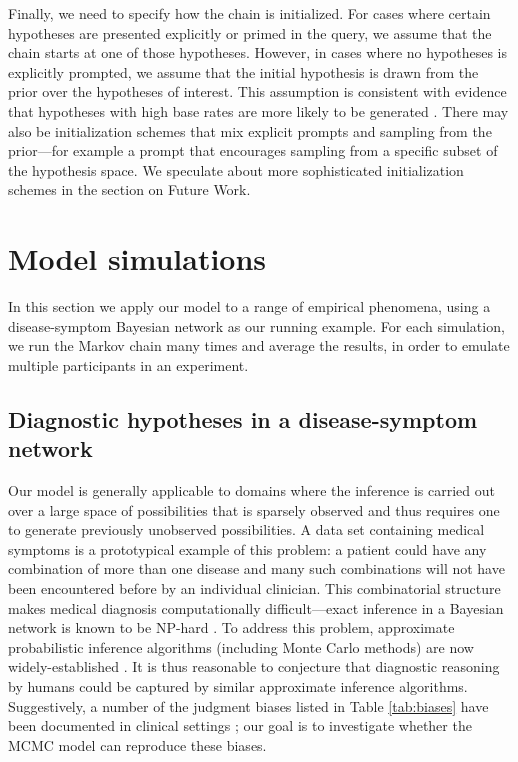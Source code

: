 
Finally, we need to specify how the chain is initialized. For cases where certain hypotheses are presented explicitly or primed in the query, we assume that the chain starts at one of those hypotheses. However, in cases where no hypotheses is explicitly prompted, we assume that the initial hypothesis is drawn from the prior over the hypotheses of interest. This assumption is consistent with evidence that hypotheses with high base rates are more likely to be generated \citep{weber1993}. There may also be initialization schemes that mix explicit prompts and sampling from the prior---for example a prompt that encourages sampling from a specific subset of the hypothesis space. We speculate about more sophisticated initialization schemes in the section on Future Work.
\section{Model simulations}

In this section we apply our model to a range of empirical phenomena, using a disease-symptom Bayesian network as our running example. For each simulation, we run the Markov chain many times and average the results, in order to emulate multiple participants in an experiment.

\subsection{Diagnostic hypotheses in a disease-symptom network}

Our model is generally applicable to domains where the inference is carried out over a large space of possibilities that is sparsely observed and thus requires one to generate previously unobserved possibilities. A data set containing medical symptoms is a prototypical example of this problem: a patient could have any combination of more than one disease and many such combinations will not have been encountered before by an individual clinician. This combinatorial structure makes medical diagnosis computationally difficult---exact inference in a Bayesian network is known to be NP-hard \citep{cooper1990complexity}. To address this problem, approximate probabilistic inference algorithms (including Monte Carlo methods) are now widely-established \citep[e.g.,][]{Shwe1991, Jaakkola1999, Heckerman1990}. It is thus reasonable to conjecture that diagnostic reasoning by humans could be captured by similar approximate inference algorithms. Suggestively, a number of the judgment biases listed in Table \ref{tab:biases} have been documented in clinical settings \citep{redelmeier1995probability,elstein1978medical,weber1993}; our goal is to investigate whether the MCMC model can reproduce these biases.

